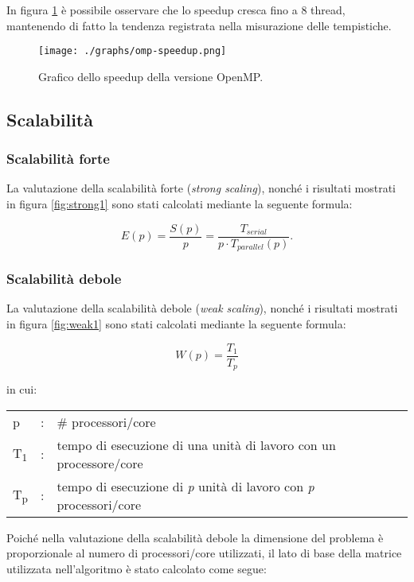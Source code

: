 In figura \ref{fig:speedup1} è possibile osservare che lo speedup cresca fino a
8 thread, mantenendo di fatto la tendenza registrata nella misurazione delle
tempistiche.

\begin{figure}[!ht]
  \centering
  \texttt{[image: ./graphs/omp-speedup.png]}
  \caption{Grafico dello speedup della versione OpenMP.}\label{fig:speedup1}
\end{figure}

\subsection{Scalabilità}

\subsubsection{Scalabilità forte}

La valutazione della scalabilità forte (\textit{strong scaling}), nonché i
risultati mostrati in figura \ref{fig:strong1} sono stati calcolati mediante
la seguente formula:

\[
    E(p) = \frac{S(p)}{p} = \frac{T_{serial}}{p \cdot T_{parallel}(p)}.
\]

\subsubsection{Scalabilità debole}

La valutazione della scalabilità debole (\textit{weak scaling}), nonché i
risultati mostrati in figura \ref{fig:weak1} sono stati calcolati mediante
la seguente formula:

\[
W(p) = \frac{T_{1}}{T_{p}}
\]

in cui:
\begin{table}[!ht]
\begin{tabular}{lll}
    p &: & \# processori/core\\
    T\textsubscript{1}&: & tempo di esecuzione di una unità di lavoro con un
    processore/core\\
    T\textsubscript{p}&: & tempo di esecuzione di \textit{p} unità di lavoro con
    \textit{p} processori/core
\end{tabular}
\end{table}

Poiché nella valutazione della scalabilità debole la dimensione del problema è
proporzionale al numero di processori/core utilizzati, il lato di base della
matrice utilizzata nell'algoritmo è stato calcolato come segue:

